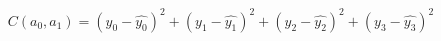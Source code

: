 \documentclass[preview]{standalone}
\begin{document}
\begin{align*}
C(a_0, a_1) = (y_0 - \hat{y_0})^2 + (y_1 - \hat{y_1})^2 + (y_2 - \hat{y_2})^2 + (y_3 - \hat{y_3})^2
\end{align*}
\end{document}
